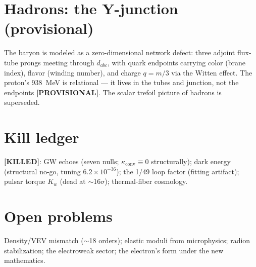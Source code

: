 \documentclass[11pt,a4paper]{article}
\newcommand{\tier}[1]{\textbf{[#1]}}
\begin{document}
\section{Hadrons: the Y-junction (provisional)}
The baryon is modeled as a zero-dimensional network defect: three adjoint flux-tube prongs
meeting through $d_{abc}$, with quark endpoints carrying color (brane index), flavor
(winding number), and charge $q = m/3$ via the Witten effect. The proton's 938~MeV is
relational --- it lives in the tubes and junction, not the endpoints \tier{PROVISIONAL}.
The scalar trefoil picture of hadrons is superseded.

\section{Kill ledger}
\tier{KILLED}: GW echoes (seven nulls; $\kappa_{\mathrm{conv}} \equiv 0$ structurally);
dark energy (structural no-go, tuning $6.2\times 10^{-36}$); the 1/49 loop factor
(fitting artifact); pulsar torque $K_w$ (dead at $\sim$16$\sigma$); thermal-fiber cosmology.

\section{Open problems}
Density/VEV mismatch ($\sim$18 orders); elastic moduli from microphysics; radion
stabilization; the electroweak sector; the electron's form under the new mathematics.
\end{document}
